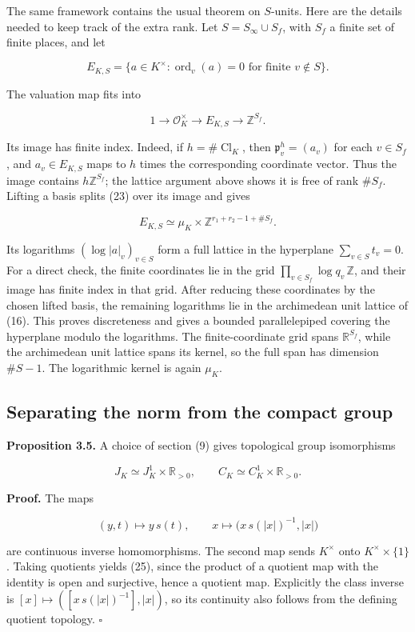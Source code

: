 \documentclass[
  english,
  11pt,
  a4paper,
]{article}
\begin{document}
The same framework contains the usual theorem on \(S\)-units. Here are
the details needed to keep track of the extra rank. Let
\(S=S_\infty\cup S_f\), with \(S_f\) a finite set of finite places, and
let

\[E_{K,S}=\{a\in K^\times:\operatorname{ord}_v(a)=0\text{ for finite }v\notin S\}.\]

The valuation map fits into

\[1\longrightarrow\mathcal O_K^\times\longrightarrow E_{K,S}
\longrightarrow\mathbb Z^{S_f}.
\tag{23}\]

Its image has finite index. Indeed, if \(h=\#\operatorname{Cl}_K\), then
\(\mathfrak p_v^h=(a_v)\) for each \(v\in S_f\), and \(a_v\in E_{K,S}\)
maps to \(h\) times the corresponding coordinate vector. Thus the image
contains \(h\mathbb Z^{S_f}\); the lattice argument above shows it is
free of rank \(\#S_f\). Lifting a basis splits (23) over its image and
gives

\[E_{K,S}\simeq\mu_K\times\mathbb Z^{r_1+r_2-1+\#S_f}.
\tag{24}\]

Its logarithms \((\log|a|_v)_{v\in S}\) form a full lattice in the
hyperplane \(\sum_{v\in S}t_v=0\). For a direct check, the finite
coordinates lie in the grid \(\prod_{v\in S_f}\log q_v\,\mathbb Z\), and
their image has finite index in that grid. After reducing these
coordinates by the chosen lifted basis, the remaining logarithms lie in
the archimedean unit lattice of (16). This proves discreteness and gives
a bounded parallelepiped covering the hyperplane modulo the logarithms.
The finite-coordinate grid spans \(\mathbb R^{S_f}\), while the
archimedean unit lattice spans its kernel, so the full span has
dimension \(\#S-1\). The logarithmic kernel is again \(\mu_K\).

\subsection{Separating the norm from the compact
group}\label{NT-ADL-03--separating-the-norm-from-the-compact-group}

\textbf{Proposition 3.5.} A choice of section (9) gives topological
group isomorphisms

\[J_K\simeq J_K^1\times\mathbb R_{>0},
\qquad C_K\simeq C_K^1\times\mathbb R_{>0}.
\tag{25}\]

\textbf{Proof.} The maps

\[(y,t)\longmapsto y\,s(t),
\qquad x\longmapsto\bigl(x\,s(|x|)^{-1},|x|\bigr)
\tag{26}\]

are continuous inverse homomorphisms. The second map sends \(K^\times\)
onto \(K^\times\times\{1\}\). Taking quotients yields (25), since the
product of a quotient map with the identity is open and surjective,
hence a quotient map. Explicitly the class inverse is
\([x]\mapsto([x\,s(|x|)^{-1}],|x|)\), so its continuity also follows
from the defining quotient topology. \(\square\)
\end{document}

